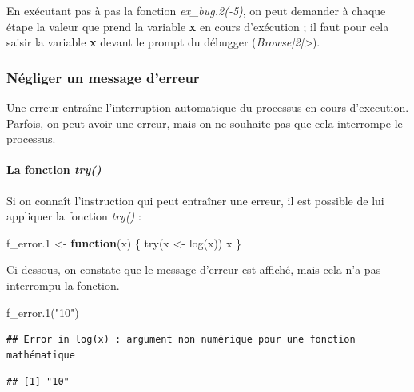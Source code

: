 \documentclass[
]{book}
\newenvironment{Shaded}{\begin{snugshade}}{\end{snugshade}}
\newcommand{\ControlFlowTok}[1]{\textcolor[rgb]{0.13,0.29,0.53}{\textbf{#1}}}
\newcommand{\FloatTok}[1]{\textcolor[rgb]{0.00,0.00,0.81}{#1}}
\newcommand{\FunctionTok}[1]{\textcolor[rgb]{0.00,0.00,0.00}{#1}}
\newcommand{\NormalTok}[1]{#1}
\newcommand{\OtherTok}[1]{\textcolor[rgb]{0.56,0.35,0.01}{#1}}
\newcommand{\StringTok}[1]{\textcolor[rgb]{0.31,0.60,0.02}{#1}}
\theoremstyle{definition}
\theoremstyle{definition}
\theoremstyle{definition}
\theoremstyle{definition}
\theoremstyle{remark}
\begin{document}
En exécutant pas à pas la fonction \emph{ex\_bug.2(-5)}, on peut demander à chaque étape la valeur que prend la variable \textbf{x} en cours d'exécution ; il faut pour cela saisir la variable \textbf{x} devant le prompt du débugger (\emph{Browse{[}2{]}\textgreater{}}).

\hypertarget{nuxe9gliger-un-message-derreur}{%
\subsubsection{Négliger un message d'erreur}\label{nuxe9gliger-un-message-derreur}}

Une erreur entraîne l'interruption automatique du processus en cours d'execution. Parfois, on peut avoir une erreur, mais on ne souhaite pas que cela interrompe le processus.

\hypertarget{la-fonction-try}{%
\paragraph{\texorpdfstring{La fonction \emph{try()}}{La fonction try()}}\label{la-fonction-try}}

Si on connaît l'instruction qui peut entraîner une erreur, il est possible de lui appliquer la fonction \emph{try()} :

\begin{Shaded}
\begin{Highlighting}[]
\NormalTok{f\_error}\FloatTok{.1} \OtherTok{\textless{}{-}} \ControlFlowTok{function}\NormalTok{(x) \{}
  \FunctionTok{try}\NormalTok{(x }\OtherTok{\textless{}{-}} \FunctionTok{log}\NormalTok{(x))}
\NormalTok{  x}
\NormalTok{\}}
\end{Highlighting}
\end{Shaded}

Ci-dessous, on constate que le message d'erreur est affiché, mais cela n'a pas interrompu la fonction.

\begin{Shaded}
\begin{Highlighting}[]
\FunctionTok{f\_error.1}\NormalTok{(}\StringTok{"10"}\NormalTok{)}
\end{Highlighting}
\end{Shaded}

\begin{verbatim}
## Error in log(x) : argument non numérique pour une fonction mathématique
\end{verbatim}

\begin{verbatim}
## [1] "10"
\end{verbatim}
\end{document}
